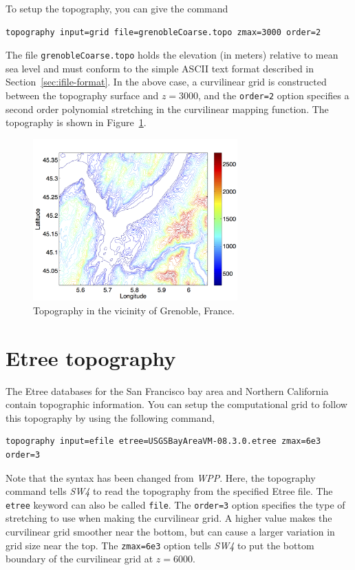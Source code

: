 \documentclass[11pt]{report}
\begin{document}
To setup the topography, you can give the command
\begin{verbatim}
topography input=grid file=grenobleCoarse.topo zmax=3000 order=2
\end{verbatim}
The file \verb+grenobleCoarse.topo+ holds the elevation (in meters) relative to mean sea level and
must conform to the simple ASCII text format described in Section~\ref{sec:ifile-format}. In the
above case, a curvilinear grid is constructed between the topography surface and $z=3000$, and the
\verb+order=2+ option specifies a second order polynomial stretching in the curvilinear mapping
function. The topography is shown in Figure~\ref{fig:grenoble-topo}.
%
\begin{figure}[htp]
  \begin{center}
    \includegraphics[width=0.7\textwidth]{grenoble-topo.png}
    \caption{Topography in the vicinity of Grenoble, France.}
    \label{fig:grenoble-topo}
  \end{center}
\end{figure}

\section{Etree topography}\label{sec:topo-efile}

The Etree databases for the San Francisco bay area and Northern California contain topographic
information. You can setup the computational grid to follow this topography by using the following command,
\begin{verbatim}
topography input=efile etree=USGSBayAreaVM-08.3.0.etree zmax=6e3 order=3
\end{verbatim}
Note that the syntax has been changed from \emph{WPP}. Here, the topography command tells \emph{SW4}
to read the topography from the specified Etree file. The \verb+etree+ keyword can also be called
\verb+file+. The \verb+order=3+ option specifies the type of stretching to use when making the
curvilinear grid. A higher value makes the curvilinear grid smoother near the bottom, but can cause
a larger variation in grid size near the top. The \verb+zmax=6e3+ option tells \emph{SW4} to put the
bottom boundary of the curvilinear grid at $z=6000$.
\end{document}
